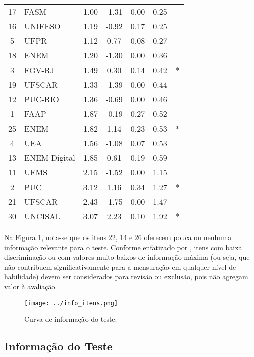 \begin{table}[!hbt]
{\begin{tabular*}{.8\textwidth}{@{\extracolsep{\fill}}clccccc@{}}
			17 & FASM & 1.00 & -1.31 & 0.00 & 0.25 \\ 
			16 & UNIFESO & 1.19 & -0.92 & 0.17 & 0.25 \\ 
			5 & UFPR & 1.12 & 0.77 & 0.08 & 0.27 \\ 
			18 & ENEM & 1.20 & -1.30 & 0.00 & 0.36 \\ 
			3 & FGV-RJ & 1.49 & 0.30 & 0.14 & 0.42 & * \\ 
			19 & UFSCAR & 1.33 & -1.39 & 0.00 & 0.44 \\ 
			12 & PUC-RIO & 1.36 & -0.69 & 0.00 & 0.46 \\ 
			1 & FAAP & 1.87 & -0.19 & 0.27 & 0.52 \\ 
			25 & ENEM & 1.82 & 1.14 & 0.23 & 0.53 & * \\ 
			4 & UEA & 1.56 & -1.08 & 0.07 & 0.53 \\ 
			13 & ENEM-Digital & 1.85 & 0.61 & 0.19 & 0.59 \\ 
			11 & UFMS & 2.15 & -1.52 & 0.00 & 1.15 \\ 
			2 & PUC & 3.12 & 1.16 & 0.34 & 1.27 & *\\ 
			21 & UFSCAR & 2.43 & -1.75 & 0.00 & 1.47 \\ 
			30 & UNCISAL & 3.07 & 2.23 & 0.10 & 1.92 & *\\ 
			\bottomrule
		\end{tabular*}
	}{%
			}
\end{table}

Na Figura \ref{fig:info_itens}, nota-se que os itens 22, 14 e 26 oferecem pouca ou nenhuma informação relevante para o teste. Conforme enfatizado por , itens com baixa discriminação ou com valores muito baixos de informação máxima (ou seja, que não contribuem significativamente para a mensuração em qualquer nível de habilidade) devem ser considerados para revisão ou exclusão, pois não agregam valor à avaliação.



\begin{figure}[!hbt]
	\centering
	\texttt{[image: ../info\_itens.png]}
	\caption{Curva de informação do teste.}
	\label{fig:info_itens}
\end{figure}

\subsection{Informação do Teste}

